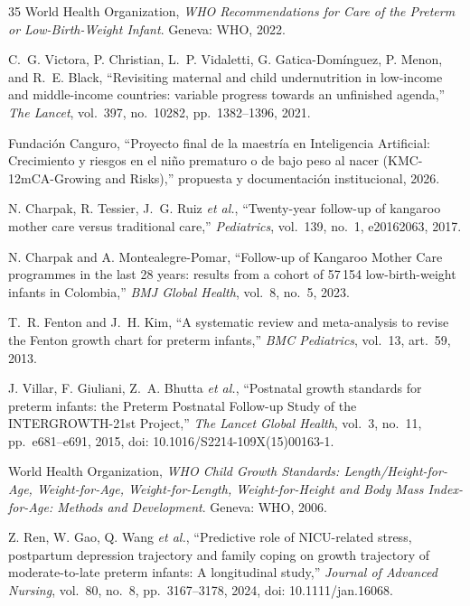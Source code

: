 \begin{thebibliography}{35}
World Health Organization, \emph{WHO Recommendations for Care of the Preterm or Low-Birth-Weight Infant}. Geneva: WHO, 2022.

C.~G. Victora, P. Christian, L.~P. Vidaletti, G. Gatica-Domínguez, P. Menon, and R.~E. Black, ``Revisiting maternal and child undernutrition in low-income and middle-income countries: variable progress towards an unfinished agenda,'' \emph{The Lancet}, vol.~397, no.~10282, pp.~1382--1396, 2021.

Fundación Canguro, ``Proyecto final de la maestría en Inteligencia Artificial: Crecimiento y riesgos en el niño prematuro o de bajo peso al nacer (KMC-12mCA-Growing and Risks),'' propuesta y documentación institucional, 2026.

N. Charpak, R. Tessier, J.~G. Ruiz \emph{et al.}, ``Twenty-year follow-up of kangaroo mother care versus traditional care,'' \emph{Pediatrics}, vol.~139, no.~1, e20162063, 2017.

N. Charpak and A. Montealegre-Pomar, ``Follow-up of Kangaroo Mother Care programmes in the last 28 years: results from a cohort of 57\,154 low-birth-weight infants in Colombia,'' \emph{BMJ Global Health}, vol.~8, no.~5, 2023.

T.~R. Fenton and J.~H. Kim, ``A systematic review and meta-analysis to revise the Fenton growth chart for preterm infants,'' \emph{BMC Pediatrics}, vol.~13, art.~59, 2013.

J. Villar, F. Giuliani, Z.~A. Bhutta \emph{et al.}, ``Postnatal growth standards for preterm infants: the Preterm Postnatal Follow-up Study of the INTERGROWTH-21st Project,'' \emph{The Lancet Global Health}, vol.~3, no.~11, pp.~e681--e691, 2015, doi: 10.1016/S2214-109X(15)00163-1.

World Health Organization, \emph{WHO Child Growth Standards: Length/Height-for-Age, Weight-for-Age, Weight-for-Length, Weight-for-Height and Body Mass Index-for-Age: Methods and Development}. Geneva: WHO, 2006.

Z. Ren, W. Gao, Q. Wang \emph{et al.}, ``Predictive role of NICU-related stress, postpartum depression trajectory and family coping on growth trajectory of moderate-to-late preterm infants: A longitudinal study,'' \emph{Journal of Advanced Nursing}, vol.~80, no.~8, pp.~3167--3178, 2024, doi: 10.1111/jan.16068.


\end{thebibliography}
